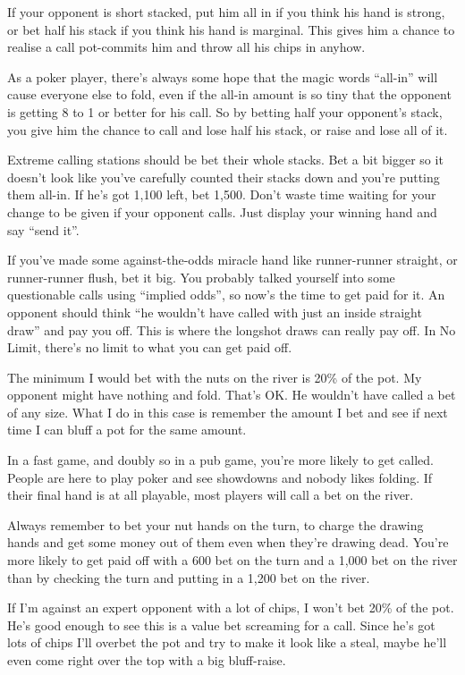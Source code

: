If your opponent is short stacked, put him all in if you think his hand is
strong, or bet half his stack if you think his hand is marginal. This
gives him a chance to realise a call pot-commits him and throw all his
chips in anyhow.

As a poker player, there's always some hope that the magic words ``all-in''
will cause everyone else to fold, even if the all-in amount is so tiny
that the opponent is getting 8 to 1 or better for his call. So by betting
half your opponent's stack, you give him the chance to call and lose half
his stack, or raise and lose all of it.

Extreme calling stations should be bet their whole stacks. Bet a bit bigger
so it doesn't look like you've carefully counted their stacks down and you're
putting them all-in. If he's got 1,100 left, bet 1,500. Don't waste time
waiting for your change to be given if your opponent calls. Just display
your winning hand and say ``send it''.

If you've made some against-the-odds miracle hand like runner-runner
straight, or runner-runner flush, bet it big. You probably talked
yourself into some questionable calls using ``implied odds'', so now's
the time to get paid for it. An opponent should think ``he wouldn't
have called with just an inside straight draw'' and pay you off. This
is where the longshot draws can really pay off. In No Limit, there's
no limit to what you can get paid off.

The minimum I would bet with the nuts on the river is 20\% of the pot.
My opponent might have nothing and fold. That's OK. He wouldn't have
called a bet of any size. What I do in this case is remember the amount
I bet and see if next time I can bluff a pot for the same amount.

In a fast game, and doubly so in a pub game, you're more likely
to get called. People are here to play poker and see showdowns and
nobody likes folding. If their final hand is at all playable, most
players will call a bet on the river.

Always remember to bet your nut hands on the turn, to charge
the drawing hands and get some money out of them even when they're
drawing dead. You're more likely to get paid off with a 600 bet on the
turn and a 1,000 bet on the river than by checking the turn and putting
in a 1,200 bet on the river.

If I'm against an expert opponent with a lot of chips, I won't bet
20\% of the pot. He's good enough to see this is a value bet screaming
for a call. Since he's got lots of chips I'll overbet the pot and try
to make it look like a steal, maybe he'll even come right over the top
with a big bluff-raise.

